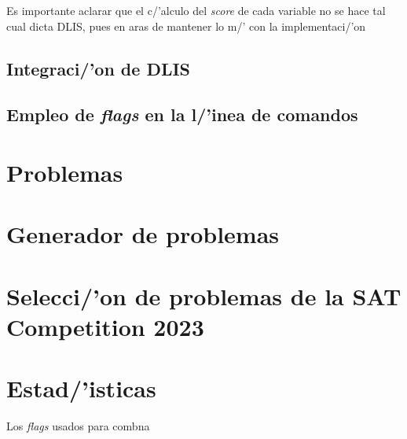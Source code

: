 Es importante aclarar que el c/'alculo del \textit{score} de cada variable no se hace tal cual dicta DLIS, pues en aras de mantener lo m/' con la implementaci/'on 

\subsection{Integraci/'on de DLIS}
\subsection{Empleo de \textit{flags} en la l/'inea de comandos}
\section{Problemas}
\section{Generador de problemas}
\section{Selecci/'on de problemas de la SAT Competition 2023}
\section{Estad/'isticas}
Los \textit{flags} usados para combna